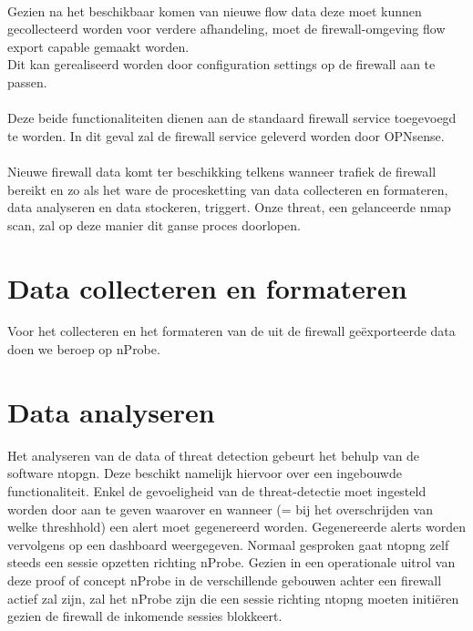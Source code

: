\paragraph{}
Gezien na het beschikbaar komen van nieuwe flow data deze moet kunnen gecollecteerd worden voor verdere afhandeling, moet de firewall-omgeving flow export capable gemaakt worden.\\ Dit kan gerealiseerd worden door configuration settings op de firewall aan te passen.

\paragraph{}
Deze beide functionaliteiten dienen aan de standaard firewall service toegevoegd te worden. In dit geval zal de firewall service geleverd worden door OPNsense.

\paragraph{}
Nieuwe firewall data komt ter beschikking telkens wanneer trafiek de firewall bereikt en zo als het ware de procesketting van data collecteren en formateren, data analyseren en data stockeren, triggert. Onze threat, een gelanceerde nmap scan, zal op deze manier dit ganse proces doorlopen.

\section{Data collecteren en formateren}
Voor het collecteren en het formateren van de uit de firewall geëxporteerde data doen we beroep op nProbe.

\section{Data analyseren}
Het analyseren van de data of threat detection gebeurt het behulp van de software ntopgn. Deze beschikt namelijk hiervoor over een ingebouwde functionaliteit. Enkel de gevoeligheid van de threat-detectie moet ingesteld worden door aan te geven waarover en wanneer (= bij het overschrijden van welke threshhold) een alert moet gegenereerd worden. Gegenereerde alerts worden vervolgens op een dashboard weergegeven. Normaal gesproken gaat ntopng zelf steeds een sessie opzetten richting nProbe. Gezien in een operationale uitrol van deze proof of concept nProbe in de verschillende gebouwen achter een firewall actief zal zijn, zal het nProbe zijn die een sessie richting ntopng moeten initiëren gezien de firewall de inkomende sessies blokkeert.

